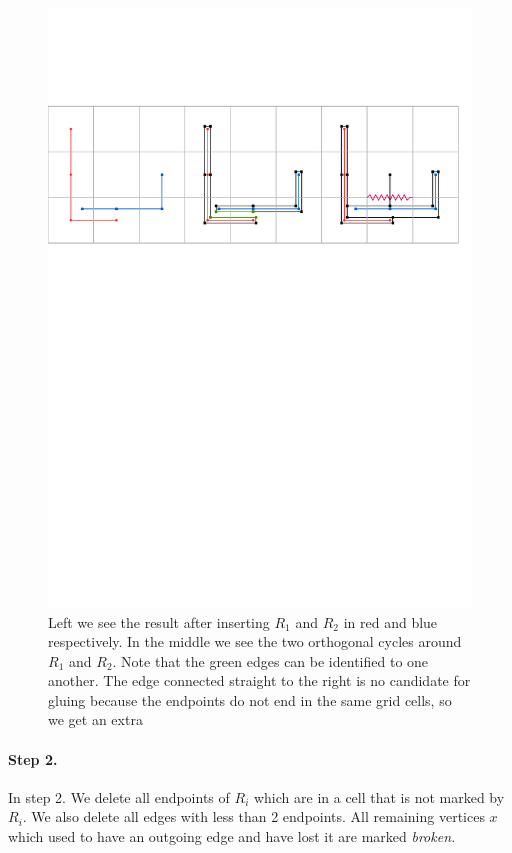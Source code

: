 \documentclass[a4paper, UKenglish]{lipics-v2018}
\begin{document}
\begin{figure}[H]
\centering
\includegraphics[page = 1]{Figures/cycle.pdf}
\caption{Left we see the result after inserting $R_1$ and $R_2$ in red and blue respectively. In the middle we see the two orthogonal cycles around $R_1$ and $R_2$. Note that the green edges can be identified to one another. The edge connected straight to the right is no candidate for gluing because the endpoints do not end in the same grid cells, so we get an extra }
\label{fig:cycle}
\end{figure}

\paragraph*{Step 2.}

In step 2. We delete all endpoints of $R_i$ which are in a cell that is not marked by $R_i$. We also delete all edges with less than 2 endpoints. All remaining vertices $x$ which used to have an outgoing edge and have lost it are marked \emph{broken.}
\end{document}

